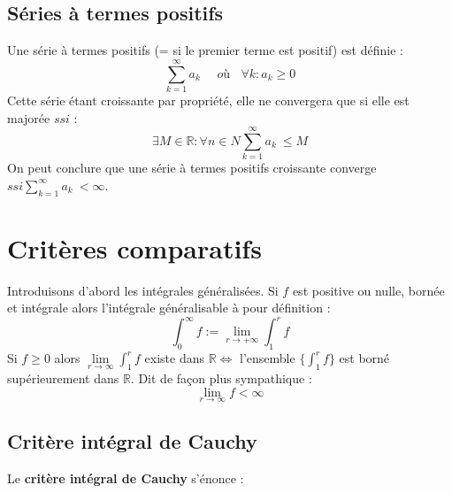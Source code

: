 \documentclass[11pt, a4paper, openany]{book}
\begin{document}
		
\subsection{Séries à termes positifs}
Une série à termes positifs (= si le premier terme est positif) est définie :
\begin{equation}
	\sum_{k=1}^\infty a_k\ \ \ \ \ \ où\ \ \ \ \forall k : a_k \geq 0
\end{equation}
Cette série étant croissante par propriété, elle ne convergera que si elle est majorée $ssi$ : 
\begin{equation}
	\exists M \in \mathbb{R} : \forall n \in N \sum_{k=1}^\infty a_k\ \leq M
\end{equation}  On peut conclure que une série à termes positifs croissante converge $ssi \sum_{k=1}^\infty a_k\ < \infty$.
		
\section{Critères comparatifs}
Introduisons d'abord les intégrales généralisées. Si $f$ est positive ou nulle, bornée et intégrale alors l'intégrale généralisable à pour définition :
\begin{equation}
	\int_0^\infty f := \lim\limits_{r \rightarrow +\infty}  \int_1^r f
\end{equation}
Si $f \geq 0$ alors $\lim\limits_{r \rightarrow \infty}  \int_1^r f$ existe dans $\mathbb{R} \Leftrightarrow$ l'ensemble $\{\int_1^r f\}$ est borné supérieurement dans $\mathbb{R}$. Dit de façon plus sympathique :
\begin{equation}
	\lim\limits_{r \rightarrow \infty} f < \infty
\end{equation}
\subsection{Critère intégral de Cauchy}
Le \textbf{critère intégral de Cauchy} s'énonce :\\
		
			
\end{document}
